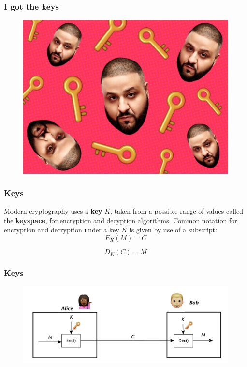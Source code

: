 \documentclass{beamer}
\newcommand{\<}{\langle}
\renewcommand{\>}{\rangle}
\begin{document}
\begin{frame}
\frametitle{I got the keys}

\begin{figure}
\includegraphics[scale=.5]{IMG/igotkeys.png}
\end{figure}
\end{frame}


\begin{frame}
\frametitle{Keys}

Modern cryptography uses a \textbf{key} $K$, taken from a possible range of values called the \textbf{keyspace}, for encryption and decyption algorithms. Common notation for encryption and decryption under a key $K$ is given by use of a subscript:
\[
E_K(M) = C
\]

\[
D_K(C) = M
\]
\end{frame}


\begin{frame}
\frametitle{Keys}

\begin{figure}
\includegraphics[scale=.5]{IMG/diag8.pdf}
\end{figure}
\end{frame}
\end{document}
